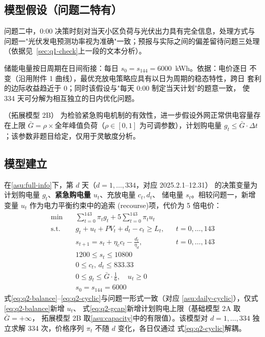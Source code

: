 \documentclass[withoutpreface,bwprint]{cumcmthesis}
\begin{document}
\subsection{模型假设（问题二特有）}
\begin{assumption}
问题二中，0:00 决策时刻对当天小区负荷与光伏出力具有完全信息，处理方式与
问题一"光伏发电预测功率视为准确"一致；预报与实际之间的偏差留待问题三处理
（依据见~\cref{sec:q1-check}上一段的文本分析）。
\label{asu:full-info}
\end{assumption}

\begin{assumption}
储能电量按日周期在日间衔接：每日 $s_0=s_{144}=6000$~kWh。依据：电价逐日
不变（沿用附件 1 曲线），最优充放电策略应具有以日为周期的稳态特性，跨日
套利的边际收益趋近于 0；同时该假设与"每天 0:00 制定当天计划"的题意一致，
使 334 天可分解为相互独立的日内优化问题。
\label{asu:daily-cyclic}
\end{assumption}

\begin{assumption}（拓展模型 2B）
为检验紧急购电机制的有效性，进一步假设外网正常供电容量存在上限
$\bar G=\rho\times$全年峰值负荷（$\rho\in[0,1]$ 为可调参数），计划购电量
$g_t\le\bar G\cdot\Delta t$；该参数非题目给定，仅用于灵敏度分析。
\label{asu:capacity}
\end{assumption}

\subsection{模型建立}
在\cref{asu:full-info}下，第 $d$ 天（$d=1,\dots,334$，对应 2025.2.1--12.31）
的决策变量为计划购电量 $g_t$、\textbf{紧急购电量 $u_t$}、充放电量 $c_t,d_t$、
储电量 $s_t$。相较问题一，新增变量 $u_t$ 作为电力平衡约束中的追索
(recourse)项，代价为 5 倍电价：
\begin{align}
\min\quad & \sum_{t=0}^{143}\pi_t g_t+5\sum_{t=0}^{143}\pi_t u_t \label{eq:q2-obj}\\
\text{s.t.}\quad
& g_t+u_t+PV_t+d_t-c_t\ge L_t, && t=0,\dots,143 \label{eq:q2-balance}\\
& s_{t+1}=s_t+\eta_c c_t-\frac{d_t}{\eta_d}, && t=0,\dots,143 \label{eq:q2-soc}\\
& 1200\le s_t\le10800 \label{eq:q2-socbound}\\
& 0\le c_t,\,d_t\le833.33 \label{eq:q2-power}\\
& 0\le g_t\le\bar G\cdot\tfrac16,\quad u_t\ge0 \label{eq:q2-gcap}\\
& s_0=s_{144}=6000 \label{eq:q2-cyclic}
\end{align}
式\eqref{eq:q2-balance}--\eqref{eq:q2-cyclic}与问题一形式一致（对应
\cref{asu:daily-cyclic}），仅式\eqref{eq:q2-balance}新增 $u_t$、
式\eqref{eq:q2-gcap}新增计划购电上限（基础模型 2A 取 $\bar G=+\infty$，
拓展模型 2B 取\cref{asu:capacity}中的有限值）。该模型对 $d=1,\dots,334$
独立求解 334 次，价格序列 $\pi_t$ 不随 $d$ 变化，各日仅通过
式\eqref{eq:q2-cyclic}解耦。
\end{document}
